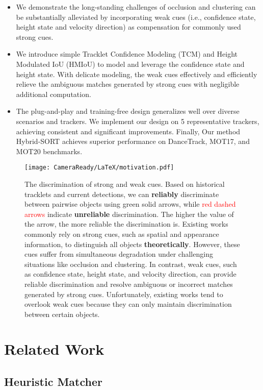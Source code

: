 \documentclass[letterpaper]{article} \usepackage{aaai23}  \usepackage{times}  \usepackage{helvet}  \usepackage{courier}  \usepackage[hyphens]{url}  \usepackage{graphicx} \urlstyle{rm} \def\UrlFont{\rm}  \usepackage{natbib}  \usepackage{caption} \frenchspacing  \setlength{\pdfpagewidth}{8.5in}  \setlength{\pdfpageheight}{11in}  \usepackage{algorithm}
\begin{document}
\begin{itemize}
\item We demonstrate the long-standing challenges of occlusion and clustering can be substantially alleviated by incorporating weak cues (i.e., confidence state, height state and velocity direction) as compensation for commonly used strong cues.
\item We introduce simple Tracklet Confidence Modeling (TCM) and Height Modulated IoU (HMIoU) to model and leverage the confidence state and height state. With delicate modeling, the weak cues effectively and efficiently relieve the ambiguous matches generated by strong cues with negligible additional computation.
\item The plug-and-play and training-free design generalizes well over diverse scenarios and trackers. We implement our design on 5 representative trackers, achieving consistent and significant improvements. Finally, Our method Hybrid-SORT achieves superior performance on DanceTrack, MOT17, and MOT20 benchmarks. \end{itemize}

\begin{figure*}[t]
\centering
\texttt{[image: CameraReady/LaTeX/motivation.pdf]} \caption{The discrimination of strong and weak cues. Based on historical tracklets and current detections, we can \textbf{reliably} discriminate between pairwise objects using \textcolor[RGB]{50, 205, 50}{green solid arrows}, while \textcolor{red}{red dashed arrows} indicate \textbf{unreliable} discrimination. The higher the value of the arrow, the more reliable the discrimination is. Existing works commonly rely on strong cues, such as spatial and appearance information, to distinguish all objects \textbf{theoretically}. However, these cues suffer from simultaneous degradation under challenging situations like occlusion and clustering. In contrast, weak cues, such as confidence state, height state, and velocity direction, can provide reliable discrimination and resolve ambiguous or incorrect matches generated by strong cues. Unfortunately, existing works tend to overlook weak cues because they can only maintain discrimination between certain objects.} \label{Motivation}
\end{figure*}

\section{Related Work}
\subsection{Heuristic Matcher}
\end{document}
